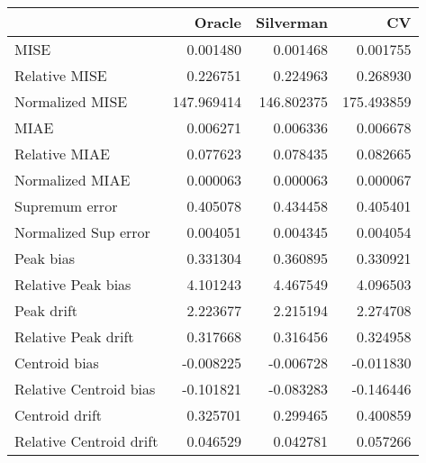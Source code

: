 \begin{tabular}{lrrr}
  \toprule
 & Oracle & Silverman & CV \\ 
  \midrule
MISE & 0.001480 & 0.001468 & 0.001755 \\ 
  Relative MISE & 0.226751 & 0.224963 & 0.268930 \\ 
  Normalized MISE & 147.969414 & 146.802375 & 175.493859 \\ 
  MIAE & 0.006271 & 0.006336 & 0.006678 \\ 
  Relative MIAE & 0.077623 & 0.078435 & 0.082665 \\ 
  Normalized MIAE & 0.000063 & 0.000063 & 0.000067 \\ 
  Supremum error & 0.405078 & 0.434458 & 0.405401 \\ 
  Normalized Sup error & 0.004051 & 0.004345 & 0.004054 \\ 
  Peak bias & 0.331304 & 0.360895 & 0.330921 \\ 
  Relative Peak bias & 4.101243 & 4.467549 & 4.096503 \\ 
  Peak drift & 2.223677 & 2.215194 & 2.274708 \\ 
  Relative Peak drift & 0.317668 & 0.316456 & 0.324958 \\ 
  Centroid bias & -0.008225 & -0.006728 & -0.011830 \\ 
  Relative Centroid bias & -0.101821 & -0.083283 & -0.146446 \\ 
  Centroid drift & 0.325701 & 0.299465 & 0.400859 \\ 
  Relative Centroid drift & 0.046529 & 0.042781 & 0.057266 \\ 
   \bottomrule
\end{tabular}

